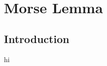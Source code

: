 \chapter{Morse Lemma}
\label{chap:MorseLemma}

\section{Introduction}
\label{sec:MorseLemma_introduction}


\begin{definition}
    \label{def:quadratic form}
    \leanok
    hi

  \end{definition}
  